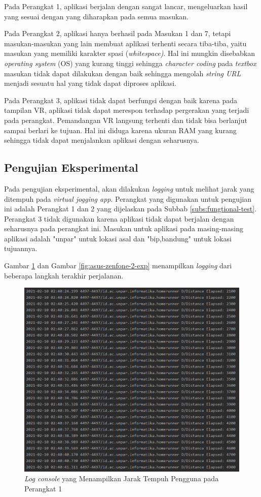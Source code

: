 Pada Perangkat 1, aplikasi berjalan dengan sangat lancar, mengeluarkan hasil yang sesuai dengan yang diharapkan pada semua masukan.

Pada Perangkat 2, aplikasi hanya berhasil pada Masukan 1 dan 7, tetapi masukan-masukan yang lain membuat aplikasi terhenti secara tiba-tiba, yaitu masukan yang memiliki karakter spasi (\textit{whitespace)}. Hal ini mungkin disebabkan \textit{operating system} (OS) yang kurang tinggi sehingga \textit{character coding} pada \textit{textbox} masukan tidak dapat dilakukan dengan baik sehingga mengolah \textit{string URL} menjadi sesuatu hal yang tidak dapat diproses aplikasi. 

Pada Perangkat 3, aplikasi tidak dapat berfungsi dengan baik karena pada tampilan VR, aplikasi tidak dapat merespon terhadap pergerakan yang terjadi pada perangkat. Pemandangan VR langsung terhenti dan tidak bisa berlanjut sampai berlari ke tujuan. Hal ini diduga karena ukuran RAM yang kurang sehingga tidak dapat menjalankan aplikasi dengan seharusnya.

\subsection{Pengujian Eksperimental}
Pada pengujian eksperimental, akan dilakukan \textit{logging} untuk melihat jarak yang ditempuh pada \textit{virtual jogging app}. Perangkat yang digunakan untuk pengujian ini adalah Perangkat 1 dan 2 yang dijelaskan pada Subbab \ref{subs:fungtional-test}. Perangkat 3 tidak digunakan karena aplikasi tidak dapat berjalan dengan seharusnya pada perangkat ini. Masukan untuk aplikasi pada masing-masing aplikasi adalah "unpar" untuk lokasi asal dan "bip,bandung" untuk lokasi tujuannya.

Gambar \ref{fig:samsung-note-8-exp} dan Gambar \ref{fig:asus-zenfone-2-exp} menampilkan \textit{logging} dari beberapa langkah terakhir perjalanan. 

\begin{figure}[h]
	\centering	\includegraphics[scale=1]
	{Gambar/samsung-note-8-exp.png}
	\caption{\textit{Log console} yang Menampilkan Jarak Tempuh Pengguna pada Perangkat 1}
	\label{fig:samsung-note-8-exp}
\end{figure}

